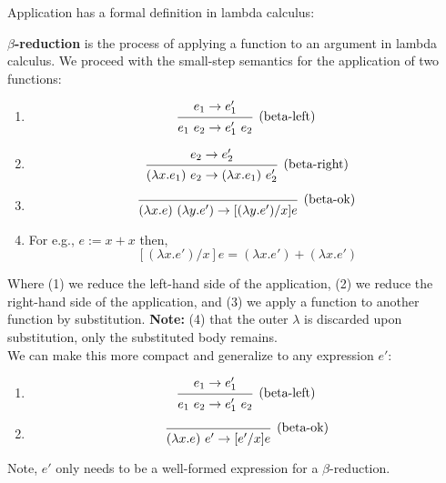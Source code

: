 \noindent
Application has a formal definition in lambda calculus:
\begin{Def}

    \label{def:beta-reduction}
    \textbf{$\beta$-reduction} is the process of applying a function to an argument in lambda calculus. We proceed with the small-step semantics
    for the application of two functions:

    \begin{enumerate}
        \item \[
        \begin{prooftree}
        \hypo{e_1 \rightarrow e_1'}
        \Infer1[(\text{beta-left})]{e_1\ e_2 \rightarrow e_1'\ e_2}
        \end{prooftree}
        \]
        \item \[
        \begin{prooftree}
        \hypo{e_2 \rightarrow e_2'}
        \Infer1[(\text{beta-right})]{(\lambda x . e_1)\ e_2 \rightarrow (\lambda x . e_1)\ e_2'}
        \end{prooftree}
        \]
        \item  \[
        \begin{prooftree}
        \Infer0[(\text{beta-ok})]{(\lambda x. e)\ (\lambda y. e') \rightarrow [(\lambda y. e')/x]e}
        \end{prooftree}
        \]
        \item For e.g., $e:= x + x$ then, \[ [(\lambda x. e')/x]e = (\lambda x. e') + (\lambda x. e') \]
    \end{enumerate}

    \noindent
    Where (1) we reduce the left-hand side of the application, (2) we reduce the right-hand side of the application, and (3) we apply a function to another function by substitution.
    \textbf{Note:} (4) that the outer $\lambda$ is discarded upon substitution, only the substituted body remains.\\

    \noindent
    We can make this more compact and generalize to any expression $e'$:

    \begin{enumerate}
        \item \[
        \begin{prooftree}
        \hypo{e_1 \rightarrow e_1'}
        \Infer1[(\text{beta-left})]{e_1\ e_2 \rightarrow e_1'\ e_2}
        \end{prooftree}
        \]
        \item \[
        \begin{prooftree}
           \Infer0[(\text{beta-ok})]{(\lambda x. e)\ e' \rightarrow [e'/x]e}
        \end{prooftree}
        \]
    \end{enumerate}

    \noindent
    Note, $e'$ only needs to be a well-formed expression for a $\beta$-reduction.

\end{Def}


